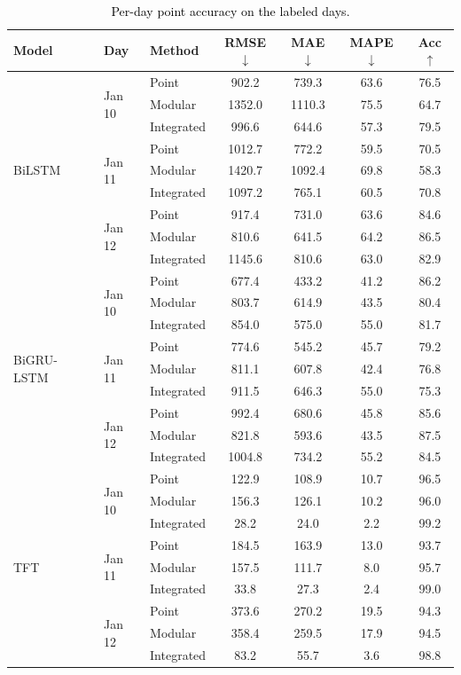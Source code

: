 \documentclass[final,10pt,1p,authoryear]{elsarticle}
\theoremstyle{definition}
\begin{document}
\begin{table}[!htbp]
\centering
\caption{\textcolor{black}{Per-day point accuracy on the labeled days.}}
\label{tab:perday_point}
\begin{tabular}{lllcccc}
\toprule
Model & Day & Method & RMSE$\downarrow$ & MAE$\downarrow$ & MAPE$\downarrow$ & Acc$\uparrow$ \\
\midrule
\multirow{9}{*}{BiLSTM}
 & \multirow{3}{*}{Jan\,10} & Point  & 902.2 & 739.3 & 63.6 & 76.5 \\
 & & Modular & 1352.0 & 1110.3 & 75.5 & 64.7 \\
 & & Integrated & 996.6 & 644.6 & 57.3 & 79.5 \\
\cmidrule{2-7}
 & \multirow{3}{*}{Jan\,11} & Point  & 1012.7 & 772.2 & 59.5 & 70.5 \\
 & & Modular & 1420.7 & 1092.4 & 69.8 & 58.3 \\
 & & Integrated & 1097.2 & 765.1 & 60.5 & 70.8 \\
\cmidrule{2-7}
 & \multirow{3}{*}{Jan\,12} & Point  & 917.4 & 731.0 & 63.6 & 84.6 \\
 & & Modular & 810.6 & 641.5 & 64.2 & 86.5 \\
 & & Integrated & 1145.6 & 810.6 & 63.0 & 82.9 \\
\midrule
\multirow{9}{*}{BiGRU-LSTM}
 & \multirow{3}{*}{Jan\,10} & Point  & 677.4 & 433.2 & 41.2 & 86.2 \\
 & & Modular & 803.7 & 614.9 & 43.5 & 80.4 \\
 & & Integrated & 854.0 & 575.0 & 55.0 & 81.7 \\
\cmidrule{2-7}
 & \multirow{3}{*}{Jan\,11} & Point  & 774.6 & 545.2 & 45.7 & 79.2 \\
 & & Modular & 811.1 & 607.8 & 42.4 & 76.8 \\
 & & Integrated & 911.5 & 646.3 & 55.0 & 75.3 \\
\cmidrule{2-7}
 & \multirow{3}{*}{Jan\,12} & Point  & 992.4 & 680.6 & 45.8 & 85.6 \\
 & & Modular & 821.8 & 593.6 & 43.5 & 87.5 \\
 & & Integrated & 1004.8 & 734.2 & 55.2 & 84.5 \\
\midrule
\multirow{9}{*}{TFT}
 & \multirow{3}{*}{Jan\,10} & Point  & 122.9 & 108.9 & 10.7 & 96.5 \\
 & & Modular & 156.3 & 126.1 & 10.2 & 96.0 \\
 & & Integrated & 28.2 & 24.0 & 2.2 & 99.2 \\
\cmidrule{2-7}
 & \multirow{3}{*}{Jan\,11} & Point  & 184.5 & 163.9 & 13.0 & 93.7 \\
 & & Modular & 157.5 & 111.7 & 8.0 & 95.7 \\
 & & Integrated & 33.8 & 27.3 & 2.4 & 99.0 \\
\cmidrule{2-7}
 & \multirow{3}{*}{Jan\,12} & Point  & 373.6 & 270.2 & 19.5 & 94.3 \\
 & & Modular & 358.4 & 259.5 & 17.9 & 94.5 \\
 & & Integrated & 83.2 & 55.7 & 3.6 & 98.8 \\
\bottomrule
\end{tabular}
\end{table}
\end{document}
